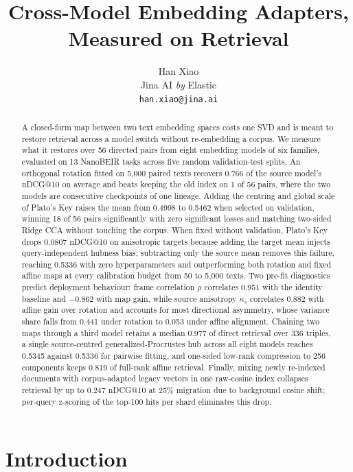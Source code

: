 \documentclass{article}
\title{Cross-Model Embedding Adapters, Measured on Retrieval}
\author{Han Xiao \\
Jina AI \textit{by} Elastic \\
\texttt{han.xiao@jina.ai}}
\begin{document}
\maketitle

\begin{abstract}
A closed-form map between two text embedding spaces costs one SVD and is meant to restore retrieval across a model switch without re-embedding a corpus. We measure what it restores over 56 directed pairs from eight embedding models of six families, evaluated on 13 NanoBEIR tasks across five random validation-test splits. An orthogonal rotation fitted on 5{,}000 paired texts recovers 0.766 of the source model's nDCG@10 on average and beats keeping the old index on 1 of 56 pairs, where the two models are consecutive checkpoints of one lineage. Adding the centring and global scale of Plato's Key raises the mean from 0.4998 to 0.5462 when selected on validation, winning 18 of 56 pairs significantly with zero significant losses and matching two-sided Ridge CCA without touching the corpus. When fixed without validation, Plato's Key drops 0.0807 nDCG@10 on anisotropic targets because adding the target mean injects query-independent hubness bias; subtracting only the source mean removes this failure, reaching 0.5336 with zero hyperparameters and outperforming both rotation and fixed affine maps at every calibration budget from 50 to 5{,}000 texts. Two pre-fit diagnostics predict deployment behaviour: frame correlation $\rho$ correlates 0.951 with the identity baseline and $-0.862$ with map gain, while source anisotropy $\kappa_s$ correlates 0.882 with affine gain over rotation and accounts for most directional asymmetry, whose variance share falls from 0.441 under rotation to 0.053 under affine alignment. Chaining two maps through a third model retains a median 0.977 of direct retrieval over 336 triples, a single source-centred generalized-Procrustes hub across all eight models reaches 0.5345 against 0.5336 for pairwise fitting, and one-sided low-rank compression to 256 components keeps 0.819 of full-rank affine retrieval. Finally, mixing newly re-indexed documents with corpus-adapted legacy vectors in one raw-cosine index collapses retrieval by up to 0.247 nDCG@10 at 25\% migration due to background cosine shift; per-query z-scoring of the top-100 hits per shard eliminates this drop.
\end{abstract}

\section{Introduction}
\end{document}
